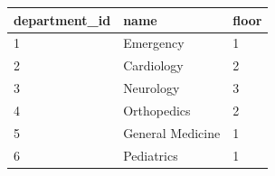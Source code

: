 {\scriptsize\setlength{\tabcolsep}{3pt}\begin{tabular}{lll}\toprule
\textbf{department\_id} & \textbf{name} & \textbf{floor} \\\midrule
1 & Emergency & 1 \\
2 & Cardiology & 2 \\
3 & Neurology & 3 \\
4 & Orthopedics & 2 \\
5 & General Medicine & 1 \\
6 & Pediatrics & 1 \\
\bottomrule\end{tabular}}
